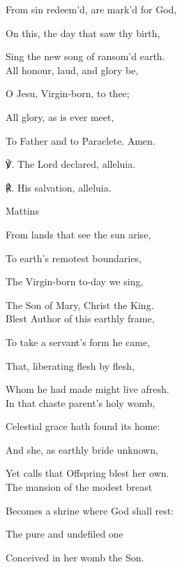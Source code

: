 \begin{paracol}{2}[]
\begin{hangparas}{1.25em}{1}
From sin redeem'd, are mark'd for God,

On this, the day that saw thy birth,

Sing the new song of ransom'd earth.\\

All honour, laud, and glory be,

O Jesu, Virgin-born, to thee;

All glory, as is ever meet,

To Father and to Paraclete. Amen.\\
\end{hangparas}

℣. The Lord declared, alleluia.

℟. His salvation, alleluia.


\switchcolumn

\begin{inhead}
	Mattins
\end{inhead}

\begin{hangparas}{1.25em}{1}
From lands that see the sun arise,

To earth's remotest boundaries,

The Virgin-born to-day we sing,

The Son of Mary, Christ the King.\\

Blest Author of this earthly frame,

To take a servant's form he came,

That, liberating flesh by flesh,

Whom he had made might live afresh.\\

In that chaste parent's holy womb,

Celestial grace hath found its home:

And she, as earthly bride unknown,

Yet calls that Offspring blest her own.\\

The mansion of the modest breast

Becomes a shrine where God shall rest:

The pure and undefiled one

Conceived in her womb the Son.\\


\end{hangparas}
\end{paracol}
